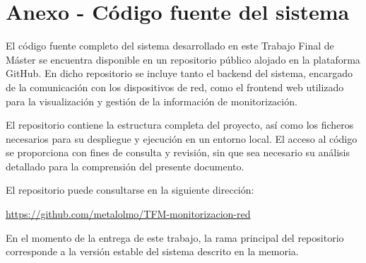 
\chapter{Anexo - Código fuente del sistema}

El código fuente completo del sistema desarrollado en este Trabajo Final de Máster se encuentra disponible en un repositorio público alojado en la plataforma GitHub. En dicho repositorio se incluye tanto el backend del sistema, encargado de la comunicación con los dispositivos de red, como el frontend web utilizado para la visualización y gestión de la información de monitorización.

El repositorio contiene la estructura completa del proyecto, así como los ficheros necesarios para su despliegue y ejecución en un entorno local. El acceso al código se proporciona con fines de consulta y revisión, sin que sea necesario su análisis detallado para la comprensión del presente documento.

El repositorio puede consultarse en la siguiente dirección:

\begin{center}
\url{https://github.com/metalolmo/TFM-monitorizacion-red}
\end{center}

En el momento de la entrega de este trabajo, la rama principal del repositorio corresponde a la versión estable del sistema descrito en la memoria.